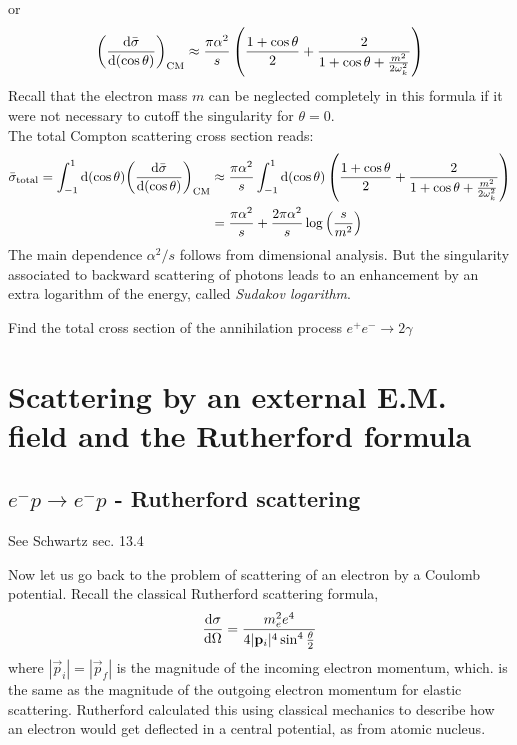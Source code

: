 \documentclass[TheoreticalPhy_ModB.tex]{subfiles}
\begin{document}
or
\[{\left(\frac{\textup{d}\bar\sigma}{\textup{d}(\cos\theta)}\right)}_{\textup{CM}}
\approx\frac{\pi\alpha^2}{s}\left(\frac{1+\cos\theta}{2}+\frac{2}{1+\cos\theta+\frac{m^2}{2\omega_k^2}}\right)\]
Recall that the electron mass $m$ can be neglected completely in this formula if it were not necessary to cutoff the singularity for $\theta=0$.\\
The total Compton scattering cross section reads:
\begin{align*}
\bar\sigma_{\textup{total}}=\int_{-1}^1\textup{d}(\cos\theta){\left(\frac{\textup{d}\bar\sigma}{\textup{d}(\cos\theta)}\right)}_{\textup{CM}}
&\approx 
\frac{\pi\alpha^2}{s}\int_{-1}^1\textup{d}(\cos\theta)\left(\frac{1+\cos\theta}{2}+\frac{2}{1+\cos\theta+\frac{m^2}{2\omega_k^2}}\right)\\
&=\frac{\pi\alpha^2}{s}+\frac{2\pi\alpha^2}{s}\log\left(\frac s{m^2}\right)
\end{align*}
The main dependence $\alpha^2/s$ follows from dimensional analysis. But the singularity associated to backward scattering of photons leads to an enhancement by an extra logarithm of the energy, called \emph{Sudakov logarithm}.

\begin{exercise}
Find the total cross section of the annihilation process $e^+e^-\rightarrow2\gamma$
\end{exercise}


\section{Scattering by an external E.M. field and the Rutherford formula}

\subsection{$e^-p\rightarrow e^-p$ - Rutherford scattering}
\textsf{See Schwartz sec. 13.4}

Now let us go back to the problem of scattering of an electron by a Coulomb potential. Recall the classical Rutherford scattering formula, 
\[\frac{\textup{d}\sigma}{\textup{d}\Omega}=\frac{m_e^2e^4}{4|\mathbf p_i|^4\sin^4\frac\theta2}\]
where $|\vec p_i|=|\vec p_f|$ is the magnitude of the incoming electron momentum, which. is the same as the magnitude of the outgoing electron momentum for elastic scattering. Rutherford calculated this using classical mechanics to describe how an electron would get deflected in a central potential, as from atomic nucleus.
\end{document}
